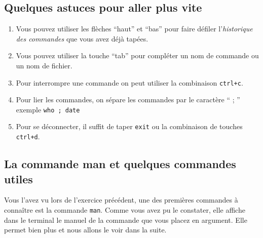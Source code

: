 \documentclass{article}
\begin{document}
\hypertarget{Quelques-astuces-pour-aller-plus-vite}{%
\subsection{Quelques astuces pour aller plus
vite}\label{quelques-astuces-pour-aller-plus-vite}}

\begin{enumerate}
\def\labelenumi{\arabic{enumi}.}
\item
  Vous pouvez utiliser les flèches ``haut'' et ``bas'' pour faire
  défiler l'\emph{historique des commandes} que vous avez déjà tapées.

\item
  Vous pouvez utiliser la touche ``tab'' pour compléter un nom de
  commande ou un nom de fichier.
  
\item
  Pour interrompre une commande on peut utiliser la combinaison \texttt{ctrl+c}.
  
\item
  Pour lier les commandes, on sépare les commandes par le caractère `` ; ''
  exemple \texttt{who ; date}

\item
 Pour se déconnecter, il suffit de taper \texttt{exit} ou la combinaison de touches \texttt{ctrl+d}.

\end{enumerate}

\hypertarget{la-commande-man-et-quelques-commandes-utiles}{%
\subsection{La commande man et quelques commandes
utiles}\label{la-commande-man-et-quelques-commandes-utiles}}

Vous l'avez vu lors de l'exercice précédent, une des premières commandes à connaître est la commande \texttt{man}.
Comme vous avez pu le constater, elle affiche dans le terminal le manuel de la commande que vous placez en argument.
Elle permet bien plus et nous allons le voir dans la suite.
\end{document}
